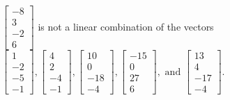 \begin{exercise}
\begin{exerciseStatement}
  \end{exerciseStatement}
  \begin{exerciseAnswer}
   \(\left[\begin{array}{c}
-8 \\
3 \\
-2 \\
6
\end{array}\right]\) 
  	 is not  
	a linear combination of the vectors \(\left[\begin{array}{c}
1 \\
-2 \\
-5 \\
-1
\end{array}\right] , \left[\begin{array}{c}
4 \\
2 \\
-4 \\
-1
\end{array}\right] , \left[\begin{array}{c}
10 \\
0 \\
-18 \\
-4
\end{array}\right] , \left[\begin{array}{c}
-15 \\
0 \\
27 \\
6
\end{array}\right] , \text{ and } \left[\begin{array}{c}
13 \\
4 \\
-17 \\
-4
\end{array}\right]\).

	
  


  \end{exerciseAnswer}
\end{exercise}
